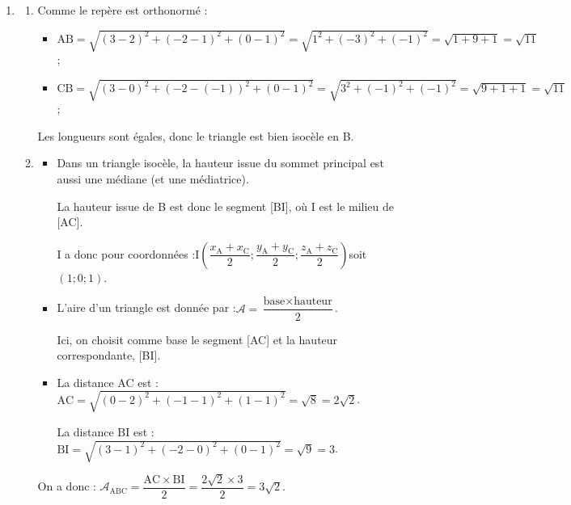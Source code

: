 \begin{enumerate}
	$\begin{aligned}[t]
		t_0 - (-t_0) + 4(2 + 4t_0) - 5 = 0
		&\iff t_0 + t_0 + 8 + 16t_0 - 5 = 0\\
		&\iff 18t_0 = -3\\
		&\iff t_0 = \dfrac{-1}{6}
	\end{aligned}$

	Le point H a donc pour coordonnées :\quad $\left(\dfrac{-1}{6} ; - \dfrac{-1}{6} ; 2 + 4\times \dfrac{-1}{6}\right)$\quad  soit $\mathrm{H}\left(-\dfrac{1}{6} ; \dfrac{1}{6} ; \dfrac{4}{3}\right) $.
	\item \begin{enumerate}
		\item Comme le repère est orthonormé :
		\begin{itemize}
			\item $\mathrm{AB} = \sqrt{(3 - 2)^2 + (-2 - 1)^2 + (0 - 1)^2} = \sqrt{1^2 + (-3)^2 + (-1)^2} = \sqrt{1 + 9 + 1} = \sqrt{11}$;
			\item $\mathrm{CB} = \sqrt{(3 - 0)^2 + (-2 - (-1))^2 + (0 - 1)^2} = \sqrt{3^2 + (-1)^2 + (-1)^2} = \sqrt{ 9 + 1 + 1} = \sqrt{11}$;
		\end{itemize}
		Les longueurs sont égales, donc le triangle est bien isocèle en B.

		\item \begin{itemize}
			\item Dans un triangle isocèle, la hauteur issue du sommet principal est aussi une médiane (et une médiatrice).

			La hauteur issue de B est donc le segment [BI], où I est le milieu de [AC].

			I a donc pour coordonnées :\quad I$\left(\dfrac{x_{\mathrm{A}} + x_{\mathrm{C}}}{2} ; \dfrac{y_{\mathrm{A}} + y_{\mathrm{C}}}{2} ; \dfrac{z_{\mathrm{A}} + z_{\mathrm{C}}}{2}\right) $\quad soit \quad $(1 ; 0 ; 1)$.

			\item L'aire d'un triangle est donnée par :\quad $\mathcal{A} = \dfrac{\text{base} \times \text{hauteur}
			}{2}$.

			Ici, on choisit comme base le segment [AC] et la hauteur correspondante, [BI].

			\item La distance AC est :\quad $\mathrm{AC} = \sqrt{(0 - 2)^2 + (-1 - 1)^2 + (1 - 1)^2} = \sqrt{8} = 2\sqrt{2}$.

			La distance BI est :\quad $\mathrm{BI} = \sqrt{(3 - 1)^2 + (-2 - 0)^2 + (0 - 1)^2} = \sqrt{9} = 3$.
		\end{itemize}
		On a donc : \quad $\mathcal{A}_{\mathrm{ABC}} = \dfrac{\mathrm{AC} \times \mathrm{BI}}{2} = \dfrac{2\sqrt{2} \times 3}{2} = 3\sqrt{2}$.
	\end{enumerate}


\end{enumerate}

